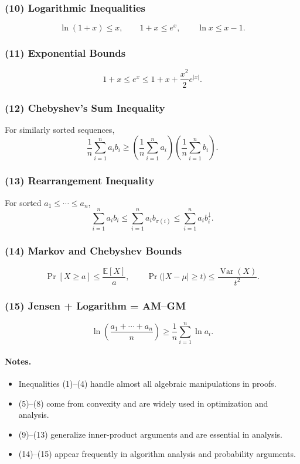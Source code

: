 \documentclass[9pt]{extarticle}
\begin{document}
\subsubsection*{(10) Logarithmic Inequalities}
\[
\ln(1+x)\le x,\qquad
1+x \le e^x,\qquad
\ln x \le x-1.
\]

\subsubsection*{(11) Exponential Bounds}
\[
1+x \le e^x \le 1 + x + \frac{x^2}{2}e^{|x|}.
\]

\subsubsection*{(12) Chebyshev's Sum Inequality}
For similarly sorted sequences,
\[
\frac{1}{n}\sum_{i=1}^n a_i b_i
\ge
\left(\frac{1}{n}\sum_{i=1}^n a_i\right)
\left(\frac{1}{n}\sum_{i=1}^n b_i\right).
\]

\subsubsection*{(13) Rearrangement Inequality}
For sorted \(a_1 \le \cdots \le a_n\),
\[
\sum_{i=1}^n a_i b_i
\le
\sum_{i=1}^n a_i b_{\sigma(i)}
\le
\sum_{i=1}^n a_i b_i^{\downarrow}.
\]

\subsubsection*{(14) Markov and Chebyshev Bounds}
\[
\Pr[X\ge a] \le \frac{\mathbb{E}[X]}{a},
\qquad
\Pr\big(|X-\mu|\ge t\big)\le \frac{\operatorname{Var}(X)}{t^2}.
\]

\subsubsection*{(15) Jensen + Logarithm = AM--GM}
\[
\ln\!\left(\frac{a_1+\cdots+a_n}{n}\right)
\ge
\frac{1}{n}\sum_{i=1}^n \ln a_i.
\]

\paragraph{Notes.}
\begin{itemize}
    \item Inequalities (1)--(4) handle almost all algebraic manipulations in proofs.
    \item (5)--(8) come from convexity and are widely used in optimization and analysis.
    \item (9)--(13) generalize inner-product arguments and are essential in analysis.
    \item (14)--(15) appear frequently in algorithm analysis and probability arguments.
\end{itemize}
\end{document}
